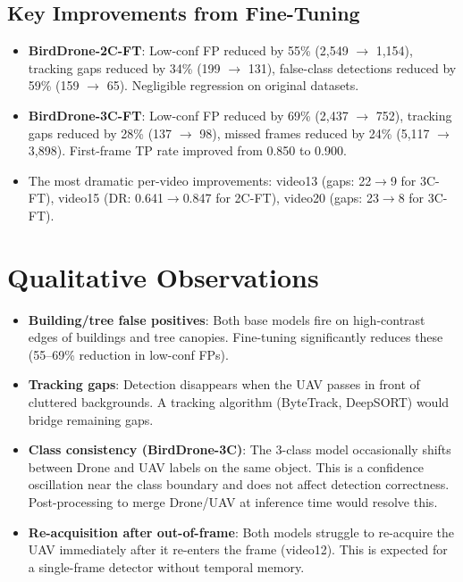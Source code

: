 \documentclass[11pt]{article}
\begin{document}
\subsection{Key Improvements from Fine-Tuning}

\begin{itemize}
  \item \textbf{BirdDrone-2C-FT}: Low-conf FP reduced by 55\% (2,549 $\to$ 1,154),
        tracking gaps reduced by 34\% (199 $\to$ 131), false-class detections
        reduced by 59\% (159 $\to$ 65). Negligible regression on original datasets.
  \item \textbf{BirdDrone-3C-FT}: Low-conf FP reduced by 69\% (2,437 $\to$ 752),
        tracking gaps reduced by 28\% (137 $\to$ 98), missed frames reduced by
        24\% (5,117 $\to$ 3,898). First-frame TP rate improved from 0.850 to 0.900.
  \item The most dramatic per-video improvements: video13 (gaps: 22$\to$9 for 3C-FT),
        video15 (DR: 0.641$\to$0.847 for 2C-FT), video20 (gaps: 23$\to$8 for 3C-FT).
\end{itemize}

\section{Qualitative Observations}

\begin{itemize}
  \item \textbf{Building/tree false positives}: Both base models fire on
        high-contrast edges of buildings and tree canopies. Fine-tuning
        significantly reduces these (55--69\% reduction in low-conf FPs).
  \item \textbf{Tracking gaps}: Detection disappears when the UAV passes
        in front of cluttered backgrounds. A tracking algorithm (ByteTrack,
        DeepSORT) would bridge remaining gaps.
  \item \textbf{Class consistency (BirdDrone-3C)}: The 3-class model
        occasionally shifts between Drone and UAV labels on the same object.
        This is a confidence oscillation near the class boundary and does not
        affect detection correctness. Post-processing to merge Drone/UAV at
        inference time would resolve this.
  \item \textbf{Re-acquisition after out-of-frame}: Both models struggle to
        re-acquire the UAV immediately after it re-enters the frame (video12).
        This is expected for a single-frame detector without temporal memory.
\end{itemize}
\end{document}
